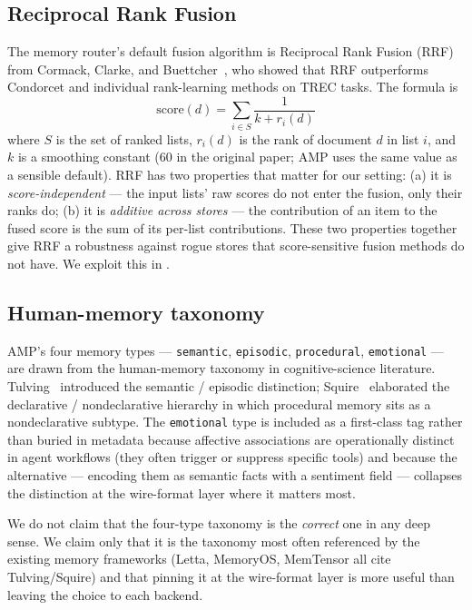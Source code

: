 \documentclass[11pt,letterpaper,twocolumn]{article}
\begin{document}
\subsection{Reciprocal Rank Fusion}
\label{sec:related-rrf}

The memory router's default fusion algorithm is Reciprocal Rank Fusion (RRF) from Cormack, Clarke, and Buettcher~\cite{cormack2009rrf}, who showed that RRF outperforms Condorcet and individual rank-learning methods on TREC tasks. The formula is
\[
  \mathrm{score}(d) = \sum_{i \in S} \frac{1}{k + r_i(d)}
\]
where $S$ is the set of ranked lists, $r_i(d)$ is the rank of document $d$ in list $i$, and $k$ is a smoothing constant (60 in the original paper; AMP uses the same value as a sensible default). RRF has two properties that matter for our setting: (a) it is \emph{score-independent} --- the input lists' raw scores do not enter the fusion, only their ranks do; (b) it is \emph{additive across stores} --- the contribution of an item to the fused score is the sum of its per-list contributions. These two properties together give RRF a robustness against rogue stores that score-sensitive fusion methods do not have. We exploit this in .

\subsection{Human-memory taxonomy}

AMP's four memory types --- \texttt{semantic}, \texttt{episodic}, \texttt{procedural}, \texttt{emotional} --- are drawn from the human-memory taxonomy in cognitive-science literature. Tulving~\cite{tulving1972episodic} introduced the semantic / episodic distinction; Squire~\cite{squire1992declarative} elaborated the declarative / nondeclarative hierarchy in which procedural memory sits as a nondeclarative subtype. The \texttt{emotional} type is included as a first-class tag rather than buried in metadata because affective associations are operationally distinct in agent workflows (they often trigger or suppress specific tools) and because the alternative --- encoding them as semantic facts with a sentiment field --- collapses the distinction at the wire-format layer where it matters most.

We do not claim that the four-type taxonomy is the \emph{correct} one in any deep sense. We claim only that it is the taxonomy most often referenced by the existing memory frameworks (Letta, MemoryOS, MemTensor all cite Tulving/Squire) and that pinning it at the wire-format layer is more useful than leaving the choice to each backend.
\end{document}
